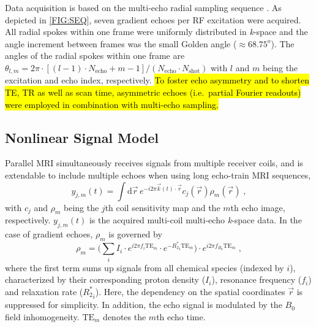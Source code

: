 \documentclass[journal,twoside,web]{ieeecolor}
\begin{document}
Data acquisition is based on the multi-echo radial sampling sequence 
\cite{tan_2019_mobawf}. 
As depicted in \cref{FIG:SEQ}, seven gradient echoes per RF excitation 
were acquired. 
All radial spokes within one frame were uniformly distributed in \textit{k}-space 
and the angle increment between frames was the small Golden angle 
\cite{winkelmann_2007_golden} ($\approx 68.75^o$).
The angles of the radial spokes within one frame are 
$\theta_{l,m} = 2\pi \cdot [ (l-1) \cdot N_\text{echo} + m - 1 ] / (N_\text{echo} \cdot N_\text{shot})$ 
with $l$ and $m$ being the excitation and echo index, respectively. 
\hl{To foster echo asymmetry and to shorten TE, TR as well as scan time, 
asymmetric echoes (i.e.~partial Fourier readouts) \mbox{\cite{untenberger_2016_asym}} 
were employed in combination with multi-echo sampling.}

\marginnote[R1.1]


\subsection{Nonlinear Signal Model}

Parallel MRI \cite{roemer_1990_pi,pruessmann_1999_sense,griswold_2002_grappa} 
simultaneously receives signals from multiple receiver coils, 
and is extendable to include multiple echoes when using long echo-train MRI sequences,
\begin{equation} \label{EQU:y_pimeco}
y_{j,m}(t) = \int \text{d} \vec{r} \, e^{-i 2\pi \vec{k} (t) \cdot \vec{r} } c_j(\vec{r}) \rho_m(\vec{r}) \;,
\end{equation}
with $c_j$ and $\rho_m$ being the $j$th coil sensitivity map and the $m$th echo image, respectively. 
$y_{j,m}(t)$ is the acquired multi-coil multi-echo \textit{k}-space data.
In the case of gradient echoes, $\rho_m$ is governed by
\begin{equation} \label{EQU:meco_mspec}
\rho_m = \bigg( \sum_i I_i \cdot e^{i2\pi f_i \text{TE}_m} \cdot e^{-{R_2^*}_i \text{TE}_m} \bigg) \cdot e^{i2\pi f_{B_0} \text{TE}_m} \; ,
\end{equation}
where the first term sums up signals from all chemical species (indexed by $i$), 
characterized by their corresponding proton density ($I_i$), 
resonance frequency ($f_i$) and relaxation rate (${R_2^*}_i$). 
Here, the dependency on the spatial coordinates $\vec{r}$ is suppressed for simplicity.
In addition, the echo signal is modulated by the $B_0$ field inhomogeneity. 
$\text{TE}_m$ denotes the $m$th echo time.
\end{document}
